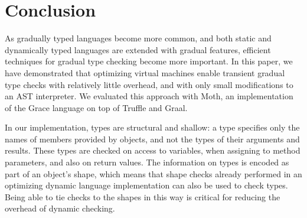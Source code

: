 
\section{Conclusion}
\label{sec:conclusion}

As gradually typed languages become more common,
and both static and dynamically typed languages are
extended with gradual features,
efficient techniques for gradual type checking become more important.
%
%
%
%
%
%
In this paper, we have demonstrated that optimizing virtual machines enable
transient gradual type checks with relatively little
overhead, and with only small modifications to an AST interpreter.
We evaluated this approach with Moth, an implementation of the Grace language
on top of Truffle and Graal.
%
%
%

In our implementation, types are structural and shallow: a type
specifies only the names of members provided by objects, and not
the types of their arguments and results.
These types are checked on access to variables,
when assigning to method parameters, and also on return values.
The information on types is encoded as part of an object's shape,
which means that shape checks already performed in an optimizing dynamic
language implementation can also be used to check types. 
Being able to tie checks to the shapes in this way is critical for 
reducing the overhead of dynamic checking.
%

